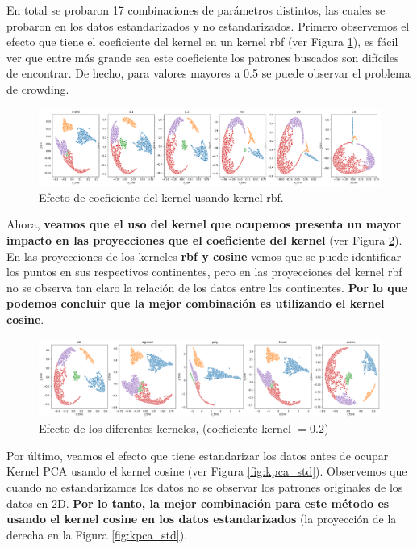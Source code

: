 \documentclass[paper=letter, fontsize=11pt]{scrartcl}
\numberwithin{equation}{section} %
\numberwithin{figure}{section} %
\numberwithin{table}{section} %
\begin{document}
En total se probaron 17 combinaciones de parámetros distintos, las cuales se probaron en los datos estandarizados y no estandarizados. Primero observemos el efecto que tiene el coeficiente del kernel en un kernel rbf (ver Figura \ref{fig:kpca_gamma}), es fácil ver que entre más grande sea este coeficiente los patrones buscados son difíciles de encontrar. De hecho, para valores mayores a 0.5 se puede observar el problema de crowding. 
\begin{figure}[H]
    \centering
    \includegraphics[scale=0.3]{figure/kpca_gamma.png}
    \caption{Efecto de coeficiente del kernel usando kernel rbf.}
    \label{fig:kpca_gamma}
\end{figure}
Ahora, \textbf{veamos que el uso del kernel que ocupemos presenta un mayor impacto en las proyecciones que el coeficiente del kernel} (ver Figura \ref{fig:kpca_kernel}). En las proyecciones de los kerneles \textbf{rbf y cosine} vemos que se puede identificar los puntos en sus respectivos continentes, pero en las proyecciones del kernel rbf no se observa tan claro la relación de los datos entre los continentes. \textbf{Por lo que podemos concluir que la mejor combinación es utilizando el kernel cosine}.  
\begin{figure}[H]
    \centering
    \includegraphics[scale=0.36]{figure/kpca_kernel.png}
    \caption{Efecto de los diferentes kerneles, (coeficiente kernel $=0.2$)}
    \label{fig:kpca_kernel}
\end{figure}
Por último, veamos el efecto que tiene estandarizar los datos antes de ocupar Kernel PCA usando el kernel cosine (ver Figura \ref{fig:kpca_std}). Observemos que cuando no estandarizamos los datos no se observar los patrones originales de los datos en 2D.
\textbf{Por lo tanto, la mejor combinación para este método es usando el kernel cosine en los datos estandarizados} (la proyección de la derecha en la Figura \ref{fig:kpca_std}). 
\end{document}
